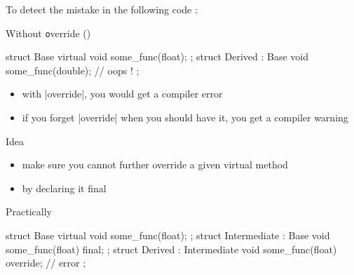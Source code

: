 \begin{frame}[fragile]
  To detect the mistake in the following code :
  \begin{block}{Without {\texttt override} ()}
    \begin{cppcode}
      struct Base {
        virtual void some_func(float);
      };
      struct Derived : Base {
        void some_func(double); // oops !
      };
    \end{cppcode}
  \end{block}
  \begin{itemize}
  \item with \cppinline|override|, you would get a compiler error
  \item if you forget \cppinline|override| when you should have it, you get a compiler warning
  \end{itemize}
\end{frame}

\begin{advanced}
\begin{frame}[fragile]
  \begin{block}{Idea}
    \begin{itemize}
    \item make sure you cannot further override a given virtual method
    \item by declaring it final
    \end{itemize}
  \end{block}
  \begin{exampleblock}{Practically}
    \begin{cppcode}
      struct Base {
        virtual void some_func(float);
      };
      struct Intermediate : Base {
        void some_func(float) final;
      };
      struct Derived : Intermediate {
        void some_func(float) override; // error
      };
    \end{cppcode}
  \end{exampleblock}
\end{frame}
\end{advanced}

